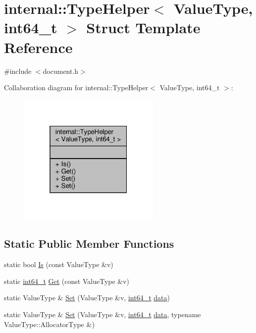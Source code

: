 \hypertarget{structinternal_1_1TypeHelper_3_01ValueType_00_01int64__t_01_4}{}\section{internal\+:\+:Type\+Helper$<$ Value\+Type, int64\+\_\+t $>$ Struct Template Reference}
\label{structinternal_1_1TypeHelper_3_01ValueType_00_01int64__t_01_4}


{\ttfamily \#include $<$document.\+h$>$}



Collaboration diagram for internal\+:\+:Type\+Helper$<$ Value\+Type, int64\+\_\+t $>$\+:
\nopagebreak
\begin{figure}[H]
\begin{center}
\leavevmode
\includegraphics[width=196pt]{structinternal_1_1TypeHelper_3_01ValueType_00_01int64__t_01_4__coll__graph}
\end{center}
\end{figure}
\subsection*{Static Public Member Functions}
\begin{DoxyCompactItemize}
\item 
static bool \hyperlink{structinternal_1_1TypeHelper_3_01ValueType_00_01int64__t_01_4_a43c171bfbe873941a1b2be698a95de74}{Is} (const Value\+Type \&v)
\item 
static \hyperlink{stdint_8h_a414156feea104f8f75b4ed9e3121b2f6}{int64\+\_\+t} \hyperlink{structinternal_1_1TypeHelper_3_01ValueType_00_01int64__t_01_4_abe3368c8817cafe420a8b3f7d6ec1759}{Get} (const Value\+Type \&v)
\item 
static Value\+Type \& \hyperlink{structinternal_1_1TypeHelper_3_01ValueType_00_01int64__t_01_4_a0c7b71569c12346902a396111782b12b}{Set} (Value\+Type \&v, \hyperlink{stdint_8h_a414156feea104f8f75b4ed9e3121b2f6}{int64\+\_\+t} \hyperlink{imgui__impl__opengl3__loader_8h_abd87654504355b4c1bb002dcb1d4d16a}{data})
\item 
static Value\+Type \& \hyperlink{structinternal_1_1TypeHelper_3_01ValueType_00_01int64__t_01_4_a85471fa774b4a8f4f56c191694a7f278}{Set} (Value\+Type \&v, \hyperlink{stdint_8h_a414156feea104f8f75b4ed9e3121b2f6}{int64\+\_\+t} \hyperlink{imgui__impl__opengl3__loader_8h_abd87654504355b4c1bb002dcb1d4d16a}{data}, typename Value\+Type\+::\+Allocator\+Type \&)
\end{DoxyCompactItemize}


